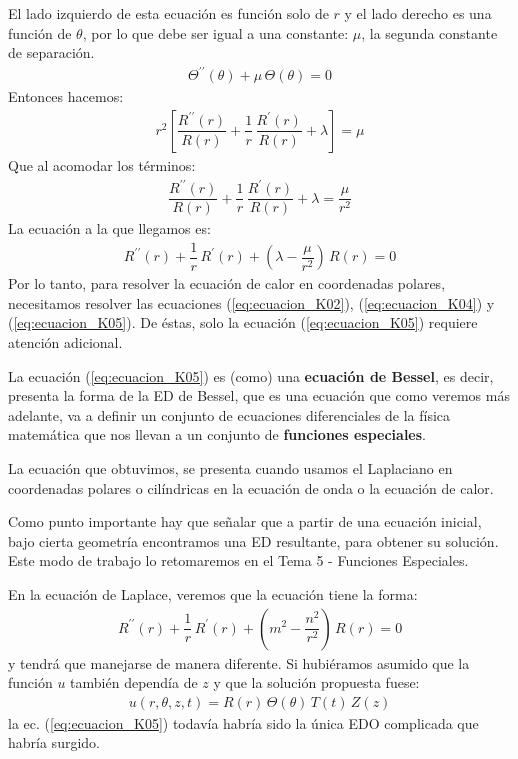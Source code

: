 \documentclass[12pt]{article}
\newcommand{\pderivada}[1]{\ensuremath{{#1}^{\prime}}}
\newcommand{\sderivada}[1]{\ensuremath{{#1}^{\prime \prime}}}
\numberwithin{equation}{section}
\begin{document}
El lado izquierdo de esta ecuación es función solo de $r$ y el lado derecho es una función de $\theta$, por lo que debe ser igual a una constante: $\mu$, la segunda constante de separación.
\begin{align}
\sderivada{\Theta} (\theta) + \mu \, \Theta (\theta) = 0
\label{eq:ecuacion_K04}    
\end{align}
Entonces hacemos:
\begin{align*}
r^{2} \left[ \dfrac{\sderivada{R} (r)}{R (r)} + \dfrac{1}{r} \, \dfrac{\pderivada{R} (r)}{R (r)} + \lambda \right] = \mu
\end{align*}
Que al acomodar los términos:
\begin{align*}
\dfrac{\sderivada{R} (r)}{R (r)} + \dfrac{1}{r} \, \dfrac{\pderivada{R} (r)}{R (r)} + \lambda = \dfrac{\mu}{r^{2}}
\end{align*}
La ecuación a la que llegamos es:
\begin{align}
\sderivada{R} (r) + \dfrac{1}{r} \, \pderivada{R} (r) + \left( \lambda - \dfrac{\mu}{r^{2}} \right) \, R(r) = 0
\label{eq:ecuacion_K05}    
\end{align}
Por lo tanto, para resolver la ecuación de calor en coordenadas polares, necesitamos resolver las ecuaciones (\ref{eq:ecuacion_K02}), (\ref{eq:ecuacion_K04}) y (\ref{eq:ecuacion_K05}). De éstas, solo la ecuación (\ref{eq:ecuacion_K05}) requiere atención adicional.
\par
La ecuación (\ref{eq:ecuacion_K05}) es (como) una \textbf{ecuación de Bessel}, es decir, presenta la forma de la ED de Bessel, que es una ecuación que como veremos más adelante, va a definir un conjunto de ecuaciones diferenciales de la física matemática que nos llevan a un conjunto de \textbf{funciones especiales}.
\par
La ecuación que obtuvimos, se presenta cuando usamos el Laplaciano en coordenadas polares o cilíndricas en la ecuación de onda o la ecuación de calor.
\par
Como punto importante hay que señalar que a partir de una ecuación inicial, bajo cierta geometría encontramos una ED resultante, para obtener su solución. Este modo de trabajo lo retomaremos en el Tema 5 - Funciones Especiales.
\par
En la ecuación de Laplace, veremos que la ecuación tiene la forma:
\begin{align*}
\sderivada{R} (r) + \dfrac{1}{r} \, \pderivada{R} (r) + \left( m^{2} - \dfrac{n^{2}}{r^{2}} \right) \, R(r) = 0
\end{align*}
y tendrá que manejarse de manera diferente. Si hubiéramos asumido que la función $u$ también dependía de $z$ y que la solución propuesta fuese:
\begin{align*}
u (r, \theta, z, t) =  R (r) \, \Theta (\theta) \, T (t) \, Z (z)
\end{align*}
la ec. (\ref{eq:ecuacion_K05}) todavía habría sido la única EDO complicada que habría surgido.
\end{document}
